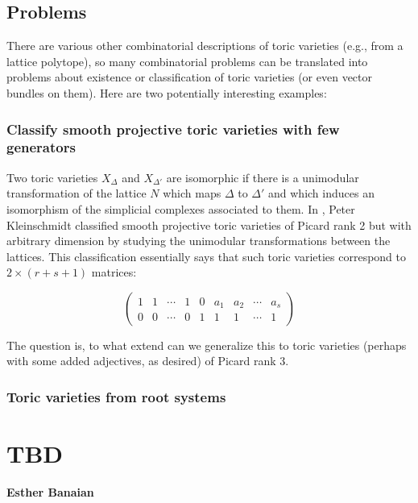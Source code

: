 \documentclass{paper}
\begin{document}
\subsection{Problems}

There are various other combinatorial descriptions of toric varieties (e.g., from a lattice polytope), so many combinatorial problems can be translated into problems about existence or classification of toric varieties (or even vector bundles on them). Here are two potentially interesting examples:

\subsubsection{Classify smooth projective toric varieties with few generators}

Two toric varieties $X_\Delta$ and $X_{\Delta'}$ are isomorphic if there is a unimodular transformation of the lattice $N$ which maps $\Delta$ to $\Delta'$ and which induces an isomorphism of the simplicial complexes associated to them. In \cite{Kleinschmidt88}, Peter Kleinschmidt classified smooth projective toric varieties of Picard rank 2 but with arbitrary dimension by studying the unimodular transformations between the lattices. This classification essentially says that such toric varieties correspond to $2 \times(r + s + 1)$ matrices:

\[
\begin{pmatrix}
  1 & 1 & \cdots & 1 & 0 & a_1 & a_2 & \cdots & a_s \\
  0 & 0 & \cdots & 0 & 1 & 1   & 1   & \cdots & 1
\end{pmatrix}
\]

The question is, to what extend can we generalize this to toric varieties (perhaps with some added adjectives, as desired) of Picard rank 3.


\subsubsection{Toric varieties from root systems}


\nocite{*}


\section{TBD}
\hfill\textbf{Esther Banaian}
	
\end{document}
